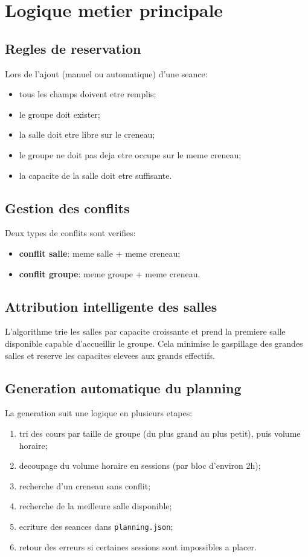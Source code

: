 \documentclass[12pt,a4paper]{article}
\begin{document}
\section{Logique metier principale}
\subsection{Regles de reservation}
Lors de l'ajout (manuel ou automatique) d'une seance:
\begin{itemize}[leftmargin=1.2cm]
    \item tous les champs doivent etre remplis;
    \item le groupe doit exister;
    \item la salle doit etre libre sur le creneau;
    \item le groupe ne doit pas deja etre occupe sur le meme creneau;
    \item la capacite de la salle doit etre suffisante.
\end{itemize}

\subsection{Gestion des conflits}
Deux types de conflits sont verifies:
\begin{itemize}[leftmargin=1.2cm]
    \item \textbf{conflit salle}: meme salle + meme creneau;
    \item \textbf{conflit groupe}: meme groupe + meme creneau.
\end{itemize}

\subsection{Attribution intelligente des salles}
L'algorithme trie les salles par capacite croissante et prend la premiere salle disponible capable d'accueillir le groupe.
Cela minimise le gaspillage des grandes salles et reserve les capacites elevees aux grands effectifs.

\subsection{Generation automatique du planning}
La generation suit une logique en plusieurs etapes:
\begin{enumerate}[leftmargin=1.2cm]
    \item tri des cours par taille de groupe (du plus grand au plus petit), puis volume horaire;
    \item decoupage du volume horaire en sessions (par bloc d'environ 2h);
    \item recherche d'un creneau sans conflit;
    \item recherche de la meilleure salle disponible;
    \item ecriture des seances dans \texttt{planning.json};
    \item retour des erreurs si certaines sessions sont impossibles a placer.
\end{enumerate}
\end{document}
